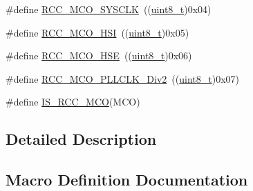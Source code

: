 \begin{DoxyCompactItemize}
\item 
\#define \hyperlink{group___clock__source__to__output__on___m_c_o__pin_gab766ad89492ffe915de3438aaa96891b}{R\+C\+C\+\_\+\+M\+C\+O\+\_\+\+S\+Y\+S\+C\+LK}~((\hyperlink{_p_e___types_8h_aba7bc1797add20fe3efdf37ced1182c5}{uint8\+\_\+t})0x04)
\item 
\#define \hyperlink{group___clock__source__to__output__on___m_c_o__pin_ga7206cdf03826781dc4fb1b094475d744}{R\+C\+C\+\_\+\+M\+C\+O\+\_\+\+H\+SI}~((\hyperlink{_p_e___types_8h_aba7bc1797add20fe3efdf37ced1182c5}{uint8\+\_\+t})0x05)
\item 
\#define \hyperlink{group___clock__source__to__output__on___m_c_o__pin_ga8bd64bbefd2a725a0cfe2f2902dd9b0f}{R\+C\+C\+\_\+\+M\+C\+O\+\_\+\+H\+SE}~((\hyperlink{_p_e___types_8h_aba7bc1797add20fe3efdf37ced1182c5}{uint8\+\_\+t})0x06)
\item 
\#define \hyperlink{group___clock__source__to__output__on___m_c_o__pin_ga1ce4233675bd7bdcb0220ed10ee7d8be}{R\+C\+C\+\_\+\+M\+C\+O\+\_\+\+P\+L\+L\+C\+L\+K\+\_\+\+Div2}~((\hyperlink{_p_e___types_8h_aba7bc1797add20fe3efdf37ced1182c5}{uint8\+\_\+t})0x07)
\item 
\#define \hyperlink{group___clock__source__to__output__on___m_c_o__pin_ga0c2d4d6aa8881e01b8c06d8816284b73}{I\+S\+\_\+\+R\+C\+C\+\_\+\+M\+CO}(M\+CO)
\end{DoxyCompactItemize}


\subsection{Detailed Description}


\subsection{Macro Definition Documentation}
